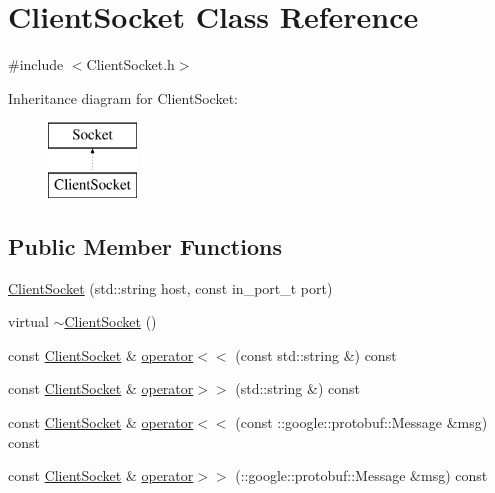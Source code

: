 \hypertarget{class_client_socket}{}\section{Client\+Socket Class Reference}
\label{class_client_socket}


{\ttfamily \#include $<$Client\+Socket.\+h$>$}

Inheritance diagram for Client\+Socket\+:\begin{figure}[H]
\begin{center}
\leavevmode
\includegraphics[height=2.000000cm]{class_client_socket}
\end{center}
\end{figure}
\subsection*{Public Member Functions}
\begin{DoxyCompactItemize}
\item 
\hyperlink{class_client_socket_a3e2c121e1538af875d208cb604f0e94c}{Client\+Socket} (std\+::string host, const in\+\_\+port\+\_\+t port)
\item 
virtual \hyperlink{class_client_socket_a9c8af4fc4f56b62ef0ff7d67037f65a3}{$\sim$\+Client\+Socket} ()
\item 
const \hyperlink{class_client_socket}{Client\+Socket} \& \hyperlink{class_client_socket_a2fe5c2037ee6bdcc4d578db1111928ba}{operator$<$$<$} (const std\+::string \&) const 
\item 
const \hyperlink{class_client_socket}{Client\+Socket} \& \hyperlink{class_client_socket_a6cb39e9222b501c8b070de60ef6b5fbc}{operator$>$$>$} (std\+::string \&) const 
\item 
const \hyperlink{class_client_socket}{Client\+Socket} \& \hyperlink{class_client_socket_ac2fbdbdab8ecb0eca85f577ba3b7917b}{operator$<$$<$} (const \+::google\+::protobuf\+::\+Message \&msg) const 
\item 
const \hyperlink{class_client_socket}{Client\+Socket} \& \hyperlink{class_client_socket_a3d8ebe603d979b9bd22ef7bc4d896968}{operator$>$$>$} (\+::google\+::protobuf\+::\+Message \&msg) const 
\end{DoxyCompactItemize}


